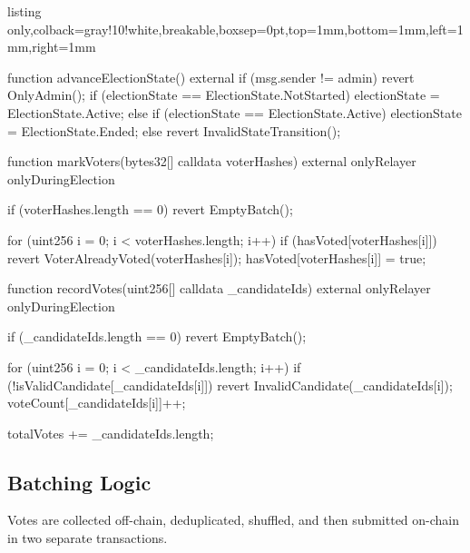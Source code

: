 \begin{tcblisting}{listing only,colback=gray!10!white,breakable,boxsep=0pt,top=1mm,bottom=1mm,left=1mm,right=1mm}
{    function advanceElectionState() external {
        if (msg.sender != admin) revert OnlyAdmin();
        if (electionState == ElectionState.NotStarted) {
            electionState = ElectionState.Active;
        } else if (electionState == ElectionState.Active) {
            electionState = ElectionState.Ended;
        } else {
            revert InvalidStateTransition();
        }
    }

    function markVoters(bytes32[] calldata voterHashes)
        external
        onlyRelayer
        onlyDuringElection
    {
        if (voterHashes.length == 0) revert EmptyBatch();

        for (uint256 i = 0; i < voterHashes.length; i++) {
            if (hasVoted[voterHashes[i]]) revert VoterAlreadyVoted(voterHashes[i]);
            hasVoted[voterHashes[i]] = true;
        }
    }

    function recordVotes(uint256[] calldata _candidateIds)
        external
        onlyRelayer
        onlyDuringElection
    {
        if (_candidateIds.length == 0) revert EmptyBatch();

        for (uint256 i = 0; i < _candidateIds.length; i++) {
            if (!isValidCandidate[_candidateIds[i]]) {
                revert InvalidCandidate(_candidateIds[i]);
            }
            voteCount[_candidateIds[i]]++;
        }

        totalVotes += _candidateIds.length;
    }
}
\end{tcblisting}

\subsection{Batching Logic}
Votes are collected off-chain, deduplicated, shuffled, and then submitted on-chain in two separate transactions.

